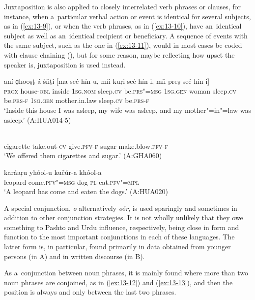 Juxtaposition is also applied to closely interrelated verb phrases or clauses, for instance, when a~particular verbal action or event is identical for several subjects, as in (\ref{ex:13-9}), or when the verb phrases, as in (\ref{ex:13-10}), have an~identical subject as well as an~identical recipient or beneficiary. A sequence of events with the same subject, such as the one in (\ref{ex:13-11}), would in most cases be coded with clause chaining (), but for some reason, maybe reflecting how upset the speaker is, juxtaposition is used instead.

\begin{exe}
\ex
\label{ex:13-9}
\gll aní ɡhooṣṭ-á šíiṭi [ma seé hín-u, míi kuṛi seé hín-i, míi preṣ seé hín-i] \\
\textsc{prox} house-\textsc{obl} inside \textsc{1sg.nom} sleep.\textsc{cv} be.\textsc{prs"=msg}  \textsc{1sg.gen} woman sleep.\textsc{cv} be.\textsc{prs-f } \textsc{1sg.gen} mother.in.law sleep.\textsc{cv} be.\textsc{prs-f} \\
\glt `Inside this house I was asleep, my wife was asleep, and my mother"=in"=law was asleep.' (A:HUA014-5)

\ex
\label{ex:13-10}
  \\
cigarette take.out-\textsc{cv} give.\textsc{pfv-f} sugar make.blow.\textsc{pfv-f} \\
\glt `We offered them cigarettes and sugar.' (A:GHA060)

\ex
\label{ex:13-11}
\gll karáaṛu yhóol-u kučúr-a khóol-a  \\
leopard come.\textsc{pfv"=msg} dog-\textsc{pl} eat.\textsc{pfv"=mpl} \\
\glt `A leopard has come and eaten the dogs.' (A:HUA020) 
\end{exe}

 A special conjunction, \textit{o} alternatively \textit{oór}, is used sparingly and sometimes in addition to other conjunction strategies. It is not wholly unlikely that they owe something to Pashto and Urdu influence, respectively, being close in form and function to the most important conjunctions in each of these languages. The latter form is, in particular, found primarily in data obtained from younger persons (in A) and in written discourse (in B). 


As a~conjunction between noun phrases, it is mainly found where more than two noun phrases are conjoined, as in (\ref{ex:13-12}) and (\ref{ex:13-13}), and then the position is always and only between the last two phrases.

